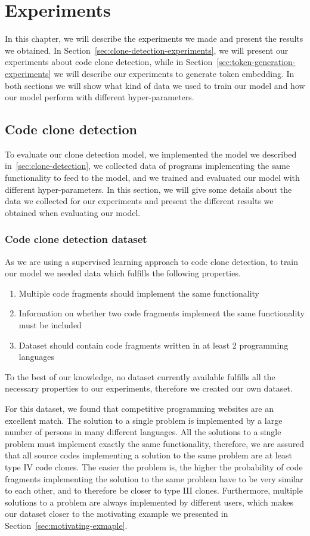 \chapter{\label{ch:experiments}Experiments}
In this chapter, we will describe the experiments we made and present the
results we obtained. In Section~\ref{sec:clone-detection-experiments}, we will
present our experiments about code clone detection, while in
Section~\ref{sec:token-generation-experiments} we will describe our experiments
to generate token embedding. In both sections we will show what kind of data we
used to train our model and how our model perform with different
hyper-parameters.
\section{\label{sec:clone-detection-experiments}Code clone detection}
To evaluate our clone detection model, we implemented the model we described
in~\ref{sec:clone-detection}, we collected data of programs implementing the
same functionality to feed to the model, and we trained and evaluated our model
with different hyper-parameters. In this section, we will give some details
about the data we collected for our experiments and present the different
results we obtained when evaluating our model.
\subsection{\label{ssec:clone-detection-dataset}Code clone detection dataset}
As we are using a supervised learning approach to code clone detection, to train
our model we needed data which fulfills the following properties.

\begin{enumerate}
\item Multiple code fragments should implement the same functionality
\item Information on whether two code fragments implement the same functionality
  must be included
\item Dataset should contain code fragments written in at least 2 programming
  languages
\end{enumerate}

To the best of our knowledge, no dataset currently available fulfills all the
necessary properties to our experiments, therefore we created our own dataset.

For this dataset, we found that competitive programming websites are an
excellent match. The solution to a single problem is implemented by a
large number of persons in many different languages. All the solutions to a
single problem must implement exactly the same functionality, therefore,
we are assured that all source codes implementing a solution to the same problem
are at least type IV code clones. The easier the problem is, the higher the
probability of code fragments implementing the solution to the same problem have
to be very similar to each other, and to therefore be closer to type III clones.
Furthermore, multiple solutions to a problem are always implemented by different
users, which makes our dataset closer to the motivating example we presented in
Section~\ref{sec:motivating-exmaple}.

